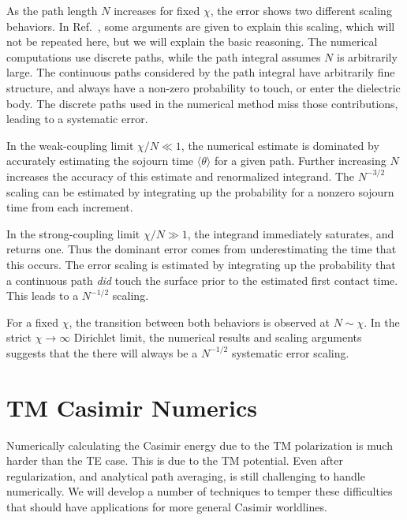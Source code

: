 As the path length $N$ increases for fixed $\chi$, the error shows two different scaling behaviors.  
In Ref.~\cite{Mackrory2016}, some arguments are given to explain this scaling, which will not be repeated here,
but we will explain the basic reasoning.  The numerical computations use discrete paths, 
while the path integral assumes $N$ is arbitrarily large.  The continuous paths considered by the path integral
have arbitrarily fine structure, and always have a non-zero probability to touch, or enter the dielectric body.
The discrete paths used in the numerical method miss those contributions, leading to a systematic error.  

In the weak-coupling limit $\chi/N\ll 1$, the numerical estimate is dominated by accurately estimating the sojourn
time $\langle\theta\rangle$ for a given path.  Further increasing $N$ increases the accuracy of this 
estimate and renormalized integrand.  The $N^{-3/2}$ scaling can be estimated by integrating up the probability for a nonzero sojourn time
from each increment.  

In the strong-coupling limit $\chi/N\gg 1$, the integrand immediately saturates, and returns one.
Thus the dominant error comes from underestimating the time that this occurs.  The error scaling
is estimated by integrating up the probability that a continuous path \emph{did} touch the surface
prior to the estimated first contact time.  This leads to a $N^{-1/2}$ scaling.

For a fixed $\chi$, the transition between both behaviors is observed at $N\sim\chi$. 
In the strict $\chi\rightarrow\infty$ Dirichlet limit, the numerical results and scaling 
arguments suggests that the there will always be a $N^{-1/2}$ systematic error scaling.  

\section{TM Casimir Numerics}
\label{sec:TM_numerics}

Numerically calculating the Casimir energy due to the TM polarization is much harder than the TE case. 
This is due to the TM potential.
Even after regularization, and analytical path averaging, is still challenging to handle numerically.
We will develop a number of techniques to temper these difficulties that should have applications for more general Casimir worldlines.

